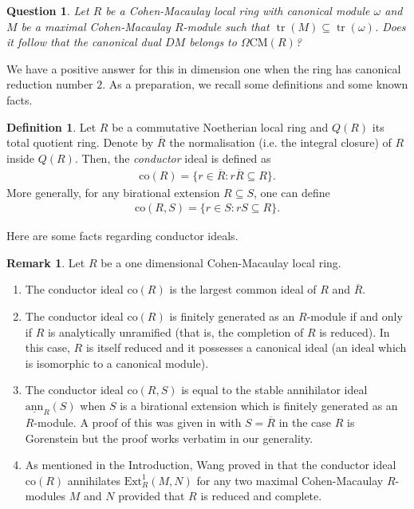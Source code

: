 \documentclass[12pt]{amsart}
\newcommand{\Ext}{\mathrm{Ext}}
\newcommand{\sann}{\underline{\mathrm{ann}}}
\newcommand\co{\mathrm{co}}
\newcommand{\CM}{\mathrm{CM}}
\newtheorem{question}[theorem]{Question}
\theoremstyle{definition}
\newtheorem{definition}[theorem]{Definition}
\newtheorem{remark}[theorem]{Remark}
\numberwithin{equation}{theorem}
\DeclareMathOperator{\tr}{\mathrm{tr}}
\begin{document}
\begin{question}
    Let $R$ be a Cohen-Macaulay local ring with canonical module $\omega$ and $M$ be a maximal Cohen-Macaulay $R$-module such that $\tr(M) \subseteq \tr(\omega)$. Does it follow that the canonical dual $DM$ belongs to $\Omega \CM(R)$? 
\end{question}
We have a positive answer for this in dimension one when the ring has canonical reduction number $2$. As a preparation, we recall some definitions and some known facts.
\begin{definition}
    Let $R$ be a commutative Noetherian local ring and $Q(R)$ its total quotient ring. Denote by $\overline{R}$ the normalisation (i.e. the integral closure) of $R$ inside $Q(R)$. Then, the \textit{conductor} ideal is defined as 
    \begin{align*}
    \co(R) = \{r \in \overline{R} \colon r \overline{R} \subseteq R \}.
    \end{align*}
    More generally, for any birational extension $R \subseteq S$, one can define 
    \begin{align*}
    \co(R,S) = \{r \in S \colon r S \subseteq R \}.
    \end{align*}    
\end{definition}
Here are some facts regarding conductor ideals.
\begin{remark}\label{conductor-remarks}
    Let $R$ be a one dimensional Cohen-Macaulay local ring.
    \begin{enumerate}
        \item The conductor ideal $\co(R)$ is the largest common ideal of $R$ and $\overline{R}$.
        \item The conductor ideal $\co(R)$ is finitely generated as an $R$-module if and only if $R$ is analytically unramified (that is, the completion of $R$ is reduced). In this case, $R$ is itself reduced and it possesses a canonical ideal (an ideal which is isomorphic to a canonical module).
        \item The conductor ideal $\co(R,S)$ is equal to the stable annihilator ideal $\sann_R(S)$ when $S$ is a birational extension which is finitely generated as an $R$-module. A proof of this was given in \cite[Corollary 4.2]{Esentepe} with $S=\overline{R}$ in the case $R$ is Gorenstein but the proof works verbatim in our generality.
        \item As mentioned in the Introduction, Wang proved in \cite[Section 3]{Wang} that the conductor ideal $\co(R)$ annihilates $\Ext_R^1(M,N)$ for any two maximal Cohen-Macaulay $R$-modules $M$ and $N$ provided that $R$ is reduced and complete.
    \end{enumerate}
\end{remark}
\end{document}
